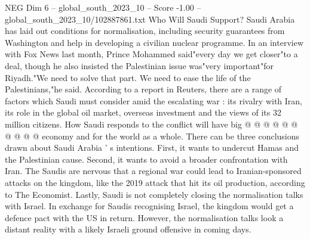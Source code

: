 \begin{textsample}{NEG Dim 6 – global\_south\_2023\_10 – Score -1.00 – global\_south\_2023\_10/102887861.txt}
Who Will Saudi Support?
Saudi Arabia has laid out conditions for normalisation, including security guarantees from Washington and help in developing a civilian nuclear programme.
In an interview with Fox News last month, Prince Mohammed said"every day we get closer"to a deal, though he also insisted the Palestinian issue was"very important"for Riyadh."We need to solve that part.
We need to ease the life of the Palestinians,"he said.
According to a report in Reuters, there are a range of factors which Saudi must consider amid the escalating war : its rivalry with Iran, its role in the global oil market, overseas investment and the views of its 32 million citizens.
How Saudi responds to the conflict will have big @ @ @ @ @ @ @ @ @ @ economy and for the world as a whole.
There can be three conclusions drawn about Saudi Arabia ' s intentions.
First, it wants to undercut Hamas and the Palestinian cause.
Second, it wants to avoid a broader confrontation with Iran.
The Saudis are nervous that a regional war could lead to Iranian-sponsored attacks on the kingdom, like the 2019 attack that hit its oil production, according to The Economist.
Lastly, Saudi is not completely closing the normalisation talks with Israel.
In exchange for Saudis recognising Israel, the kingdom would get a defence pact with the US in return.
However, the normalisation talks look a distant reality with a likely Israeli ground offensive in coming days.

\end{textsample}
